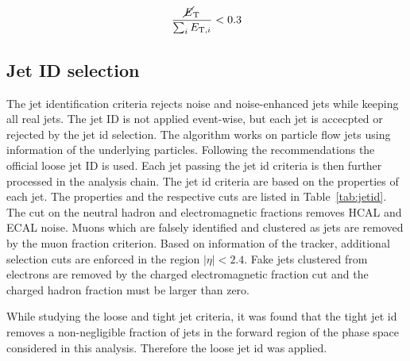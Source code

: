 \begin{equation}
    \frac{\cancel{E}_{\mathrm{T}}}{\sum_i E_{\mathrm{T},i}} < 0.3
\end{equation}


\subsection{Jet ID selection}

The jet identification criteria rejects noise and noise-enhanced
jets while keeping all real jets. The jet ID is not applied event-wise, but each
jet is accecpted or rejected by the jet id selection. The algorithm works on
particle flow jets using information of the underlying particles. 
Following the recommendations the official loose jet ID is used. Each jet
passing the jet id criteria is then further processed in the analysis chain. The
jet id criteria are based on the properties of each jet. The properties and the
respective cuts are listed in Table~\ref{tab:jetid}. The cut on the neutral
hadron and electromagnetic fractions removes HCAL and ECAL noise. Muons which
are falsely identified and clustered as jets are removed by the muon fraction
criterion. Based on information of the tracker, additional selection cuts are
enforced in the region $|\eta| < 2.4$. Fake jets clustered from electrons are
removed by the charged electromagnetic fraction cut and the charged hadron
fraction must be larger than zero.

While studying the loose and tight jet criteria, it was found that the tight jet
id removes a non-negligible fraction of jets in the forward region of the
phase space considered in this analysis. Therefore the loose jet id was applied.


